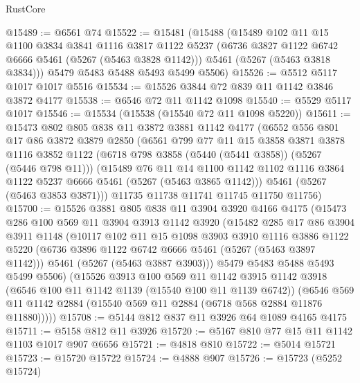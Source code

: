 \begin{lexlean}{RustCore}
\begin{coremodule}
@15489 := @6561 @74
@15522 := @15481
    (@15488
      (@15489
        @102
        @11
        @15
        @1100
        @3834
        @3841
        @1116
        @3817
        @1122
        @5237
        (@6736 @3827 @1122 @6742 @6666 @5461 (@5267 (@5463 @3828 @1142)))
        @5461
        (@5267 (@5463 @3818 @3834)))
      @5479
      @5483
      @5488
      @5493
      @5499
      @5506)
@15526 := @5512 @5117 @1017 @1017 @5516
@15534 := @15526 @3844 @72 @839 @11 @1142 @3846 @3872 @4177
@15538 := @6546 @72 @11 @1142 @1098
@15540 := @5529 @5117 @1017
@15546 := @15534 (@15538 (@15540 @72 @11 @1098 @5220))
@15611 := @15473
    @802
    @805
    @838
    @11
    @3872
    @3881
    @1142
    @4177
    (@6552
      @556
      @801
      @17
      @86
      @3872
      @3879
      @2850
      (@6561
        @799
        @77
        @11
        @15
        @3858
        @3871
        @3878
        @1116
        @3852
        @1122
        (@6718 @798 @3858 (@5440 (@5441 @3858)) (@5267 (@5446 @798 @11)))
        (@15489
          @76
          @11
          @14
          @1100
          @1142
          @1102
          @1116
          @3864
          @1122
          @5237
          @6666
          @5461
          (@5267 (@5463 @3865 @1142)))
        @5461
        (@5267 (@5463 @3853 @3871)))
      @11735
      @11738
      @11741
      @11745
      @11750
      @11756)
@15700 := @15526
    @3881
    @805
    @838
    @11
    @3904
    @3920
    @4166
    @4175
    (@15473
      @286
      @100
      @569
      @11
      @3904
      @3913
      @1142
      @3920
      (@15482
        @285
        @17
        @86
        @3904
        @3911
        @1148
        (@10117
          @102
          @11
          @15
          @1098
          @3903
          @3910
          @1116
          @3886
          @1122
          @5220
          (@6736 @3896 @1122 @6742 @6666 @5461 (@5267 (@5463 @3897 @1142)))
          @5461
          (@5267 (@5463 @3887 @3903)))
        @5479
        @5483
        @5488
        @5493
        @5499
        @5506)
      (@15526
        @3913
        @100
        @569
        @11
        @1142
        @3915
        @1142
        @3918
        (@6546 @100 @11 @1142 @1139 (@15540 @100 @11 @1139 @6742))
        (@6546 @569 @11 @1142 @2884 (@15540 @569 @11 @2884 (@6718 @568 @2884 @11876 @11880)))))
@15708 := @5144 @812 @837 @11 @3926 @64 @1089 @4165 @4175
@15711 := @5158 @812 @11 @3926
@15720 := @5167 @810 @77 @15 @11 @1142 @1103 @1017 @907 @6656
@15721 := @4818 @810
@15722 := @5014 @15721
@15723 := @15720 @15722
@15724 := @4888 @907
@15726 := @15723 (@5252 @15724)

\end{coremodule}
\end{lexlean}
